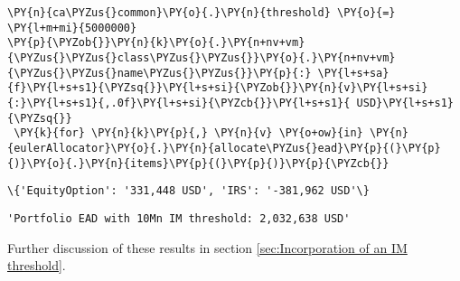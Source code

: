     \begin{tcolorbox}[breakable, size=fbox, boxrule=1pt, pad at break*=1mm,colback=cellbackground, colframe=cellborder]
\begin{Verbatim}[commandchars=\\\{\}]
\PY{n}{ca\PYZus{}common}\PY{o}{.}\PY{n}{threshold} \PY{o}{=} \PY{l+m+mi}{5000000}
\PY{p}{\PYZob{}}\PY{n}{k}\PY{o}{.}\PY{n+nv+vm}{\PYZus{}\PYZus{}class\PYZus{}\PYZus{}}\PY{o}{.}\PY{n+nv+vm}{\PYZus{}\PYZus{}name\PYZus{}\PYZus{}}\PY{p}{:} \PY{l+s+sa}{f}\PY{l+s+s1}{\PYZsq{}}\PY{l+s+si}{\PYZob{}}\PY{n}{v}\PY{l+s+si}{:}\PY{l+s+s1}{,.0f}\PY{l+s+si}{\PYZcb{}}\PY{l+s+s1}{ USD}\PY{l+s+s1}{\PYZsq{}}
 \PY{k}{for} \PY{n}{k}\PY{p}{,} \PY{n}{v} \PY{o+ow}{in} \PY{n}{eulerAllocator}\PY{o}{.}\PY{n}{allocate\PYZus{}ead}\PY{p}{(}\PY{p}{)}\PY{o}{.}\PY{n}{items}\PY{p}{(}\PY{p}{)}\PY{p}{\PYZcb{}}
\end{Verbatim}
\end{tcolorbox}

            \begin{tcolorbox}[breakable, size=fbox, boxrule=.5pt, pad at break*=1mm, opacityfill=0]
\begin{Verbatim}[commandchars=\\\{\}]
\{'EquityOption': '331,448 USD', 'IRS': '-381,962 USD'\}
\end{Verbatim}
\end{tcolorbox}
        
            \begin{tcolorbox}[breakable, size=fbox, boxrule=.5pt, pad at break*=1mm, opacityfill=0]
\begin{Verbatim}[commandchars=\\\{\}]
'Portfolio EAD with 10Mn IM threshold: 2,032,638 USD'
\end{Verbatim}
\end{tcolorbox}
        
    Further discussion of these results in section
\ref{sec:Incorporation of an IM threshold}.



